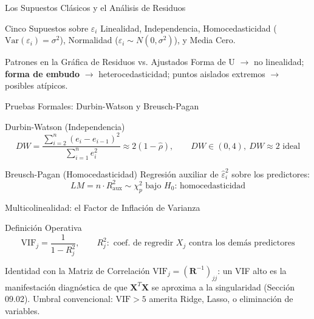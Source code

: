 \documentclass[10pt, aspectratio=169]{beamer}
\begin{document}
\begin{frame}{Los Supuestos Clásicos y el Análisis de Residuos}
  \footnotesize
  \begin{block}{Cinco Supuestos sobre $\varepsilon_i$}
    Linealidad, Independencia, Homocedasticidad ($\text{Var}(\varepsilon_i)=\sigma^2$), Normalidad ($\varepsilon_i\sim N(0,\sigma^2)$), y Media Cero.
  \end{block}
  \pause

  \vspace{0.1cm}
  \begin{alertblock}{Patrones en la Gráfica de Residuos vs. Ajustados}
    Forma de U $\to$ no linealidad; \textbf{forma de embudo} $\to$ heterocedasticidad; puntos aislados extremos $\to$ posibles atípicos.
  \end{alertblock}
\end{frame}

\begin{frame}{Pruebas Formales: Durbin-Watson y Breusch-Pagan}
  \footnotesize
  \begin{block}{Durbin-Watson (Independencia)}
    $$DW=\frac{\sum_{i=2}^n(e_i-e_{i-1})^2}{\sum_{i=1}^n e_i^2}\approx2(1-\hat\rho), \qquad DW\in(0,4),\ DW\approx2 \text{ ideal}$$
  \end{block}
  \pause

  \vspace{0.1cm}
  \begin{alertblock}{Breusch-Pagan (Homocedasticidad)}
    Regresión auxiliar de $\hat\varepsilon_i^2$ sobre los predictores: $$LM=n\cdot R_{\text{aux}}^2 \sim \chi^2_p \text{ bajo } H_0\text{: homocedasticidad}$$
  \end{alertblock}
\end{frame}

\begin{frame}{Multicolinealidad: el Factor de Inflación de Varianza}
  \footnotesize
  \begin{block}{Definición Operativa}
    $$\text{VIF}_j=\frac{1}{1-R_j^2}, \qquad R_j^2: \text{ coef. de regredir } X_j \text{ contra los demás predictores}$$
  \end{block}
  \pause

  \vspace{0.1cm}
  \begin{alertblock}{Identidad con la Matriz de Correlación}
    $\text{VIF}_j=(\mathbf{R}^{-1})_{jj}$: un VIF alto es la manifestación diagnóstica de que $\mathbf{X}^T\mathbf{X}$ se aproxima a la singularidad (Sección 09.02). Umbral convencional: $\text{VIF}>5$ amerita Ridge, Lasso, o eliminación de variables.
  \end{alertblock}
\end{frame}
\end{document}
